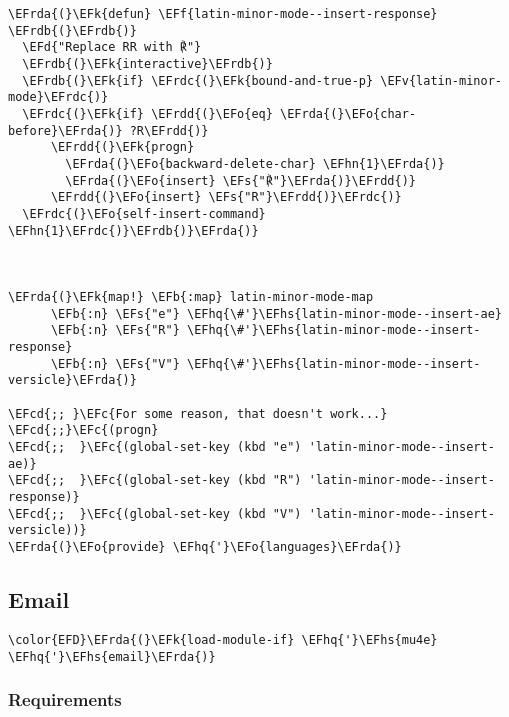 \documentclass[a4wide,10pt]{article}
\newcommand{\EFc}[1]{\textcolor{EFc}{#1}} %
\newcommand{\EFcd}[1]{\textcolor{EFcd}{#1}} %
\newcommand{\EFs}[1]{\textcolor{EFs}{#1}} %
\newcommand{\EFd}[1]{\textcolor{EFd}{#1}} %
\newcommand{\EFk}[1]{\textcolor{EFk}{#1}} %
\newcommand{\EFb}[1]{\textcolor{EFb}{#1}} %
\newcommand{\EFf}[1]{\textcolor{EFf}{#1}} %
\newcommand{\EFv}[1]{\textcolor{EFv}{#1}} %
\newcommand{\EFo}[1]{\textcolor{EFo}{#1}} %
\newcommand{\EFhn}[1]{\textcolor{EFhn}{\textbf{#1}}} %
\newcommand{\EFhq}[1]{\textcolor{EFhq}{#1}} %
\newcommand{\EFhs}[1]{\textcolor{EFhs}{#1}} %
\newcommand{\EFrda}[1]{\textcolor{EFrda}{#1}} %
\newcommand{\EFrdb}[1]{\textcolor{EFrdb}{#1}} %
\newcommand{\EFrdc}[1]{\textcolor{EFrdc}{#1}} %
\newcommand{\EFrdd}[1]{\textcolor{EFrdd}{#1}} %
\begin{document}
\begin{Code}
\begin{Verbatim}
\EFrda{(}\EFk{defun} \EFf{latin-minor-mode--insert-response} \EFrdb{(}\EFrdb{)}
  \EFd{"Replace RR with ℟"}
  \EFrdb{(}\EFk{interactive}\EFrdb{)}
  \EFrdb{(}\EFk{if} \EFrdc{(}\EFk{bound-and-true-p} \EFv{latin-minor-mode}\EFrdc{)}
  \EFrdc{(}\EFk{if} \EFrdd{(}\EFo{eq} \EFrda{(}\EFo{char-before}\EFrda{)} ?R\EFrdd{)}
      \EFrdd{(}\EFk{progn}
        \EFrda{(}\EFo{backward-delete-char} \EFhn{1}\EFrda{)}
        \EFrda{(}\EFo{insert} \EFs{"℟"}\EFrda{)}\EFrdd{)}
      \EFrdd{(}\EFo{insert} \EFs{"R"}\EFrdd{)}\EFrdc{)}
  \EFrdc{(}\EFo{self-insert-command} \EFhn{1}\EFrdc{)}\EFrdb{)}\EFrda{)}



\EFrda{(}\EFk{map!} \EFb{:map} latin-minor-mode-map
      \EFb{:n} \EFs{"e"} \EFhq{\#'}\EFhs{latin-minor-mode--insert-ae}
      \EFb{:n} \EFs{"R"} \EFhq{\#'}\EFhs{latin-minor-mode--insert-response}
      \EFb{:n} \EFs{"V"} \EFhq{\#'}\EFhs{latin-minor-mode--insert-versicle}\EFrda{)}

\EFcd{;; }\EFc{For some reason, that doesn't work...}
\EFcd{;;}\EFc{(progn}
\EFcd{;;  }\EFc{(global-set-key (kbd "e") 'latin-minor-mode--insert-ae)}
\EFcd{;;  }\EFc{(global-set-key (kbd "R") 'latin-minor-mode--insert-response)}
\EFcd{;;  }\EFc{(global-set-key (kbd "V") 'latin-minor-mode--insert-versicle))}
\EFrda{(}\EFo{provide} \EFhq{'}\EFo{languages}\EFrda{)}
\end{Verbatim}
\end{Code}

\subsection{Email}
\label{sec:orga1f915a}
\begin{Code}
\begin{Verbatim}
\color{EFD}\EFrda{(}\EFk{load-module-if} \EFhq{'}\EFhs{mu4e} \EFhq{'}\EFhs{email}\EFrda{)}
\end{Verbatim}
\end{Code}
\subsubsection{Requirements}
\label{sec:org4551dd8}
\end{document}

